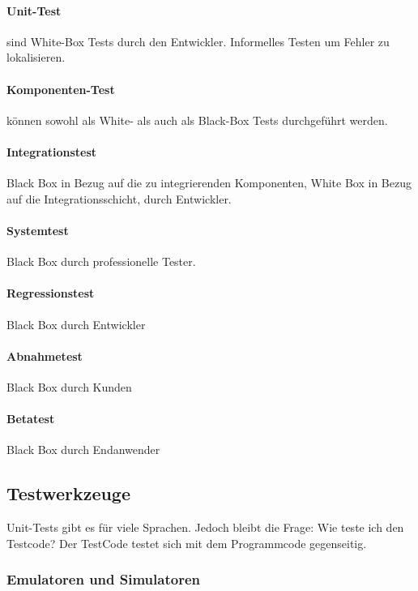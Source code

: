 \paragraph{Unit-Test} sind White-Box Tests durch den Entwickler. Informelles Testen um Fehler zu lokalisieren.

\paragraph{Komponenten-Test} können sowohl als White- als auch als Black-Box Tests durchgeführt werden.

\paragraph{Integrationstest} Black Box in Bezug auf die zu integrierenden Komponenten, White Box in Bezug auf die Integrationsschicht, durch Entwickler.

\paragraph{Systemtest} Black Box durch professionelle Tester.

\paragraph{Regressionstest} Black Box durch Entwickler

\paragraph{Abnahmetest} Black Box durch Kunden

\paragraph{Betatest} Black Box durch Endanwender

\subsection{Testwerkzeuge}
Unit-Tests gibt es für viele Sprachen. Jedoch bleibt die Frage: Wie teste ich den Testcode? Der TestCode testet sich mit dem Programmcode gegenseitig.

\subsubsection{Emulatoren und Simulatoren}

